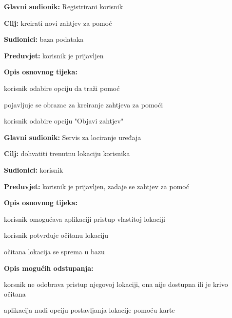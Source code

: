 \noindent {}
\begin{packed_item}
	\item \textbf{Glavni sudionik: } Registrirani korisnik
	\item  \textbf{Cilj:} kreirati novi zahtjev za pomoć
	\item  \textbf{Sudionici:} baza podataka
	\item  \textbf{Preduvjet:} korisnik je prijavljen
	\item  \textbf{Opis osnovnog tijeka:}
	
	\item[] \begin{packed_enum}
		
		\item korisnik odabire opciju da traži pomoć
		\item pojavljuje se obrazac za kreiranje zahtjeva za pomoći
		\item korisnik odabire opciju "Objavi zahtjev"
	\end{packed_enum}
\end{packed_item}
\noindent {}
\begin{packed_item}
	\item \textbf{Glavni sudionik: } Servis za lociranje uređaja
	\item  \textbf{Cilj:} dohvatiti trenutnu lokaciju korisnika
	\item  \textbf{Sudionici:} korisnik
	\item  \textbf{Preduvjet:} korisnik je prijavljen, zadaje se zahtjev za pomoć
	\item  \textbf{Opis osnovnog tijeka:}
	
	\item[] \begin{packed_enum}
		
		\item korisnik omogućava aplikaciji pristup vlastitoj lokaciji
		\item korisnik potvrđuje očitanu lokaciju
		\item očitana lokacija se sprema u bazu
	\end{packed_enum}
	\item  \textbf{Opis mogućih odstupanja:}
	
	\item[] \begin{packed_item}
		
		\item[1.a] korsnik ne odobrava pristup njegovoj lokaciji, ona nije dostupna ili je krivo očitana
		\item[] \begin{packed_enum}
			
			\item aplikacija nudi opciju postavljanja lokacije pomoću karte
			
		\end{packed_enum}
	\end{packed_item}
\end{packed_item}
